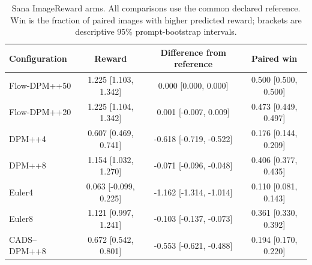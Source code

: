 \begin{table}[t]\centering\small
\caption{Sana ImageReward arms. All comparisons use the common declared reference. Win is the fraction of paired images with higher predicted reward; brackets are descriptive 95\% prompt-bootstrap intervals.}
\begin{tabular}{lccc}\toprule
Configuration & Reward & Difference from reference & Paired win \\\midrule
Flow-DPM++50 & 1.225 [1.103, 1.342] & 0.000 [0.000, 0.000] & 0.500 [0.500, 0.500] \\
Flow-DPM++20 & 1.225 [1.104, 1.342] & 0.001 [-0.007, 0.009] & 0.473 [0.449, 0.497] \\
DPM++4 & 0.607 [0.469, 0.741] & -0.618 [-0.719, -0.522] & 0.176 [0.144, 0.209] \\
DPM++8 & 1.154 [1.032, 1.270] & -0.071 [-0.096, -0.048] & 0.406 [0.377, 0.435] \\
Euler4 & 0.063 [-0.099, 0.225] & -1.162 [-1.314, -1.014] & 0.110 [0.081, 0.143] \\
Euler8 & 1.121 [0.997, 1.241] & -0.103 [-0.137, -0.073] & 0.361 [0.330, 0.392] \\
CADS--DPM++8 & 0.672 [0.542, 0.801] & -0.553 [-0.621, -0.488] & 0.194 [0.170, 0.220] \\
\bottomrule\end{tabular}\end{table}
